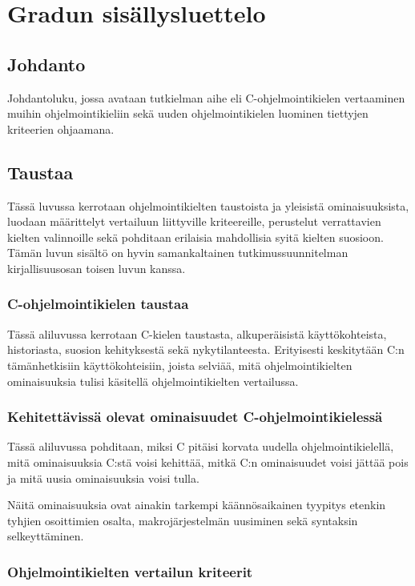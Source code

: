 \section{Gradun sisällysluettelo}

\subsection{Johdanto}

Johdantoluku, jossa avataan tutkielman aihe eli C-ohjelmointikielen vertaaminen
muihin ohjelmointikieliin sekä uuden ohjelmointikielen luominen tiettyjen
kriteerien ohjaamana.

\subsection{Taustaa}

Tässä luvussa kerrotaan ohjelmointikielten taustoista ja yleisistä
ominaisuuksista, luodaan määrittelyt vertailuun liittyville kriteereille,
perustelut verrattavien kielten valinnoille sekä pohditaan erilaisia
mahdollisia syitä kielten suosioon. Tämän luvun sisältö on hyvin samankaltainen
tutkimussuunnitelman kirjallisuusosan toisen luvun kanssa.

\subsubsection{C-ohjelmointikielen taustaa}

Tässä aliluvussa kerrotaan C-kielen taustasta, alkuperäisistä käyttökohteista,
historiasta, suosion kehityksestä sekä nykytilanteesta. Erityisesti keskitytään
C:n tämänhetkisiin käyttökohteisiin, joista selviää, mitä ohjelmointikielten
ominaisuuksia tulisi käsitellä ohjelmointikielten vertailussa.

\subsubsection{Kehitettävissä olevat ominaisuudet C-ohjelmointikielessä}

Tässä aliluvussa pohditaan, miksi C pitäisi korvata uudella
ohjelmointikielellä, mitä ominaisuuksia C:stä voisi kehittää, mitkä C:n
ominaisuudet voisi jättää pois ja mitä uusia ominaisuuksia voisi tulla.

Näitä ominaisuuksia ovat ainakin tarkempi käännösaikainen tyypitys etenkin
tyhjien osoittimien osalta, makrojärjestelmän uusiminen sekä syntaksin
selkeyttäminen.

\subsubsection{Ohjelmointikielten vertailun kriteerit}

